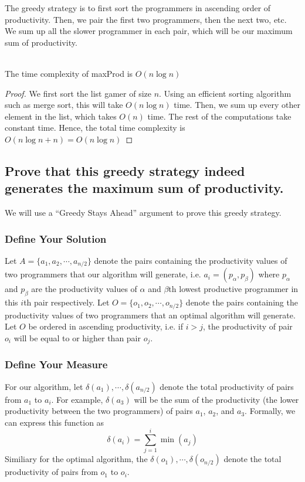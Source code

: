 \documentclass[11pt]{scrartcl}
\begin{document}
\iffalse
	The greedy strategy is to first sort the programmers in ascending order of productivity.
	Then, we pair the first two programmers, then the next two, etc. We sum up all the
	slower programmer in each pair, which will be our maximum sum of productivity.
	\begin{algorithm}
	\end{algorithm}\\
	The time complexity of maxProd is $O(n\log n)$
	\begin{proof}
		We first sort the list gamer of size $n$. Using an efficient sorting algorithm such as
		merge sort, this will take $O(n\log n)$ time. Then, we sum up every other element
		in the list, which takes $O(n)$ time. The rest of the computations take constant time.
		Hence, the total time complexity is $O(n\log n + n) = O(n\log n)$
	\end{proof}
	\subsection{
		Prove that this greedy strategy indeed generates the maximum sum of
		productivity.
	}
	We will use a “Greedy Stays Ahead” argument to prove this greedy strategy.
	\subsubsection{
		Define Your Solution
	}
	Let $A=\{a_1, a_2, \cdots, a_{n/2}\}$ denote the pairs containing the productivity values of two programmers
	that our algorithm will generate, i.e. $a_i = (p_\alpha, p_\beta)$ where $p_\alpha$ and $p_\beta$ are the
	productivity values of $\alpha$ and $\beta$th lowest productive programmer in this $i$th pair respectively.
	Let $O = \{o_1, o_2, \cdots, o_{n/2}\}$ denote the pairs containing the productivity values of two programmers
	that an optimal algorithm will generate. Let $O$ be ordered in ascending productivity, i.e. if $i>j$,
	the productivity of pair $o_i$ will be equal to or higher than pair $o_j$.
	\subsubsection{
		Define Your Measure
	}
	For our algorithm, let $\delta(a_1), \cdots, \delta(a_{n/2})$ denote the total productivity of pairs
	from $a_1$ to $a_i$. For example, $\delta(a_3)$ will be the sum of the productivity (the
	lower productivity between the two programmers) of pairs $a_1$, $a_2$, and $a_3$.
	Formally, we can express this function as
	$$\delta(a_i) = \sum_{j=1}^i \min(a_j)$$
	Similiary for the optimal algorithm, the $\delta(o_1), \cdots, \delta(o_{n/2})$ denote
	the total productivity of pairs from $o_1$ to $o_i$.
\end{document}
